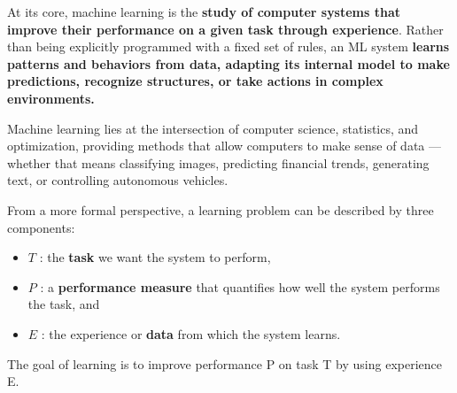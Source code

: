\documentclass[10pt, letterpaper]{report}
\begin{document}
At its core, machine learning is the \textbf{study of computer systems that improve their performance on a given task through experience}.
Rather than being explicitly programmed with a fixed set of rules, an ML system \textbf{learns patterns and behaviors from data, adapting its internal model to make predictions, recognize structures, or take actions in complex environments.}\bigskip

Machine learning lies at the intersection of computer science, statistics, and optimization, providing methods that allow computers to make sense of data — whether that means classifying images, predicting financial trends, generating text, or controlling autonomous vehicles.\bigskip

From a more formal perspective, a learning problem can be described by three components:\begin{itemize}
	\item $T$ : the \textbf{task} we want the system to perform,
	\item $P$ : a \textbf{performance measure} that quantifies how well the system performs the task, and
	\item $E$ : the experience or \textbf{data} from which the system learns.
\end{itemize}

The goal of learning is to improve performance P on task T by using experience E.\bigskip
\end{document}
